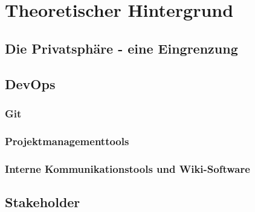 \chapter{Theoretischer Hintergrund} %
\label{Background} %

\section{Die Privatsphäre - eine Eingrenzung}

\section{DevOps}

\subsection{Git}

\subsection{Projektmanagementtools}

\subsection{Interne Kommunikationstools und Wiki-Software}

\section{Stakeholder}
